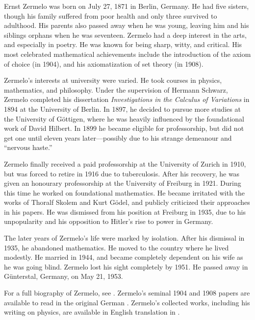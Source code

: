 \documentclass[../../../include/open-logic-section]{subfiles}
\begin{document}



Ernst Zermelo was born on July 27, 1871 in Berlin, Germany. He had
five sisters, though his family suffered from poor health and only
three survived to adulthood. His parents also passed away when he was
young, leaving him and his siblings orphans when he was seventeen.
Zermelo had a deep interest in the arts, and especially in poetry. He
was known for being sharp, witty, and critical. His most celebrated
mathematical achievements include the introduction of the axiom of
choice (in 1904), and his axiomatization of set theory (in 1908).

Zermelo's interests at university were varied. He took courses in
physics, mathematics, and philosophy. Under the supervision of Hermann
Schwarz, Zermelo completed his dissertation \emph{Investigations in
  the Calculus of Variations} in 1894 at the University of Berlin. In
1897, he decided to pursue more studies at the University of
G\"{o}ttigen, where he was heavily influenced by the foundational work
of David Hilbert. In 1899 he became eligible for professorship, but
did not get one until eleven years later---possibly due to his strange
demeanour and ``nervous haste.''

Zermelo finally received a paid professorship at the University of
Zurich in 1910, but was forced to retire in 1916 due to
tuberculosis. After his recovery, he was given an honourary
professorship at the University of Freiburg in 1921. During this time
he worked on foundational mathematics.  He became irritated with the
works of Thoralf Skolem and Kurt G\"{o}del, and publicly criticized
their approaches in his papers.  He was dismissed from his position at
Freiburg in 1935, due to his unpopularity and his opposition to
Hitler's rise to power in Germany.
 
The later years of Zermelo's life were marked by isolation. After his
dismissal in 1935, he abandoned mathematics. He moved to the country
where he lived modestly. He married in 1944, and became completely
dependent on his wife as he was going blind. Zermelo lost his sight
completely by 1951. He passed away in G\"{u}nterstal, Germany, on May
21, 1953.

\begin{reading}
For a full biography of Zermelo, see \citet{Ebbinghaus2015}.
Zermelo's seminal 1904 and 1908 papers are available to read in the
original German \citep{Zermelo1904,Zermelo1908}.  Zermelo's collected
works, including his writing on physics, are available in English
translation in \citep{Ebbinghaus2010,Ebbinghaus2013}.
\end{reading}
\end{document}
